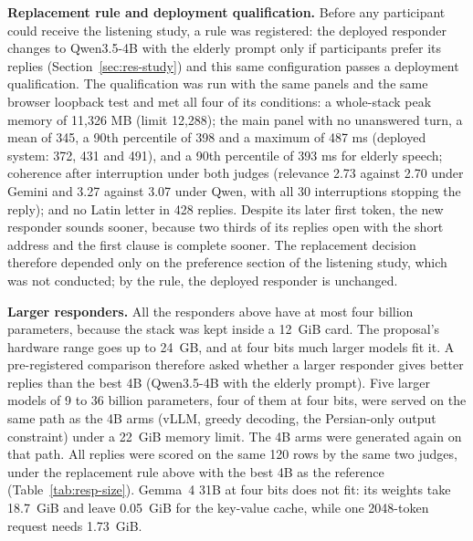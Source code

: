 \textbf{Replacement rule and deployment qualification.} Before any participant could
receive the listening study, a rule was registered: the deployed responder changes to Qwen3.5-4B with the elderly
prompt only if participants prefer its replies (Section~\ref{sec:res-study}) and this same
configuration passes a deployment qualification. The qualification was run with the same
panels and the same browser loopback test and met all four of its conditions: a whole-stack
peak memory of 11,326 MB (limit 12,288); the main panel with no unanswered turn, a mean of
345, a 90th percentile of 398 and a maximum of 487 ms (deployed system: 372, 431 and 491),
and a 90th percentile of 393 ms for elderly speech; coherence after interruption under
both judges (relevance 2.73 against 2.70 under Gemini and 3.27 against 3.07 under Qwen,
with all 30 interruptions stopping the reply); and no Latin letter in 428 replies. Despite
its later first token, the new responder sounds sooner, because two thirds of its replies
open with the short address  and the first clause is complete sooner. The
replacement decision therefore depended only on the preference section of the listening
study, which was not conducted; by the rule, the deployed responder is unchanged.

\textbf{Larger responders.} All the responders above have at most four billion
parameters, because the stack was kept inside a 12~GiB card. The proposal's hardware range
goes up to 24~GB, and at four bits much larger models fit it. A pre-registered comparison
therefore asked whether a larger responder gives better replies than the best 4B
(Qwen3.5-4B with the elderly prompt). Five larger models of 9 to 36 billion parameters,
four of them at four bits, were served on the same path as the 4B arms (vLLM, greedy
decoding, the Persian-only output constraint) under a 22~GiB memory limit. The 4B arms
were generated again on that path. All replies were scored on the same 120 rows by the
same two judges, under the replacement rule above with the best 4B as the reference
(Table~\ref{tab:resp-size}). Gemma~4 31B at four bits does not fit: its weights take
18.7~GiB and leave 0.05~GiB for the key-value cache, while one 2048-token request needs
1.73~GiB.

